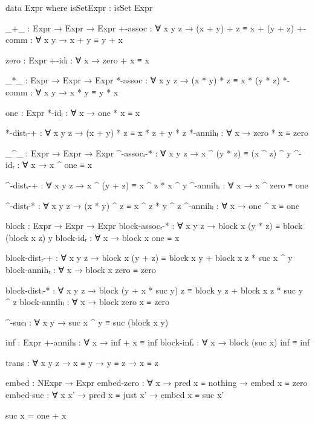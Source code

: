 \begin{code}
  data Expr where
    isSetExpr : isSet Expr

    _+_ : Expr → Expr → Expr
    +-assoc : ∀ x y z → (x + y) + z ≡ x + (y + z)
    +-comm : ∀ x y → x + y ≡ y + x

    zero : Expr
    +-idₗ : ∀ x → zero + x ≡ x

    _*_ : Expr → Expr → Expr
    *-assoc : ∀ x y z → (x * y) * z ≡ x * (y * z)
    *-comm : ∀ x y → x * y ≡ y * x

    one : Expr
    *-idₗ : ∀ x → one * x ≡ x

    *-distₗ-+ : ∀ x y z → (x + y) * z ≡ x * z + y * z
    *-annihₗ : ∀ x → zero * x ≡ zero

    _^_ : Expr → Expr → Expr
    ^-assocᵣ-* : ∀ x y z → x ^ (y * z) ≡ (x ^ z) ^ y
    ^-idᵣ : ∀ x → x ^ one ≡ x

    ^-distᵣ-+ : ∀ x y z → x ^ (y + z) ≡ x ^ z * x ^ y
    ^-annihᵣ : ∀ x → x ^ zero ≡ one

    ^-distₗ-* : ∀ x y z → (x * y) ^ z ≡ x ^ z * y ^ z
    ^-annihₗ : ∀ x → one ^ x ≡ one

    block : Expr → Expr → Expr
    block-assocᵣ-* :
      ∀ x y z → block x (y * z) ≡ block (block x z) y
    block-idᵣ : ∀ x → block x one ≡ x

    block-distᵣ-+ :
      ∀ x y z →
      block x (y + z) ≡ block x y + block x z * suc x ^ y
    block-annihᵣ : ∀ x → block x zero ≡ zero

    block-distₗ-* :
      ∀ x y z →
      block (y + x * suc y) z ≡
      block y z + block x z * suc y ^ z
    block-annihₗ : ∀ x → block zero x ≡ zero

    ^-sucₗ : ∀ x y → suc x ^ y ≡ suc (block x y)

    inf : Expr
    +-annihₗ : ∀ x → inf + x ≡ inf
    block-infᵣ : ∀ x → block (suc x) inf ≡ inf

    trans : ∀ {x y z} → x ≡ y → y ≡ z → x ≡ z

    embed : NExpr → Expr
    embed-zero :
      ∀ x → pred x ≡ nothing → embed x ≡ zero
    embed-suc :
      ∀ x x' → pred x ≡ just x' → embed x ≡ suc x'

  suc x = one + x
\end{code}
